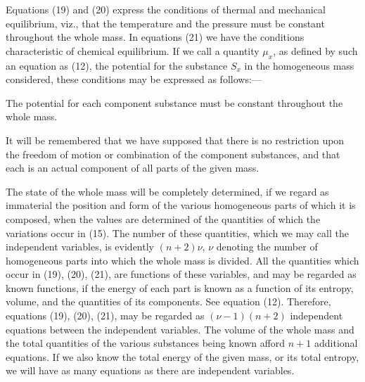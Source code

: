 \documentclass[11pt]{article}
\begin{document}
Equations (19) and (20) express the conditions of thermal and mechanical equilibrium, viz., that the temperature and the pressure must be constant throughout the whole mass. In equations (21) we have the conditions characteristic of chemical equilibrium. If we call a quantity \(\mu_x\), as defined by such an equation as (12), the potential for the substance \(S_x\) in the homogeneous mass considered, these conditions may be expressed as follows:—

The potential for each component substance must be constant throughout the whole mass.

It will be remembered that we have supposed that there is no restriction upon the freedom of motion or combination of the component substances, and that each is an actual component of all parts of the given mass.

The state of the whole mass will be completely determined, if we regard as immaterial the position and form of the various homogeneous parts of which it is composed, when the values are determined of the quantities of which the variations occur in (15). The number of these quantities, which we may call the independent variables, is evidently \((n+2)\nu\), \(\nu\) denoting the number of homogeneous parts into which the whole mass is divided. All the quantities which occur in (19), (20), (21), are functions of these variables, and may be regarded as known functions, if the energy of each part is known as a function of its entropy, volume, and the quantities of its components. See equation (12). Therefore, equations (19), (20), (21), may be regarded as \((\nu-1)(n+2)\) independent equations between the independent variables. The volume of the whole mass and the total quantities of the various substances being known afford \(n+1\) additional equations. If we also know the total energy of the given mass, or its total entropy, we will have as many equations as there are independent variables.
\end{document}
